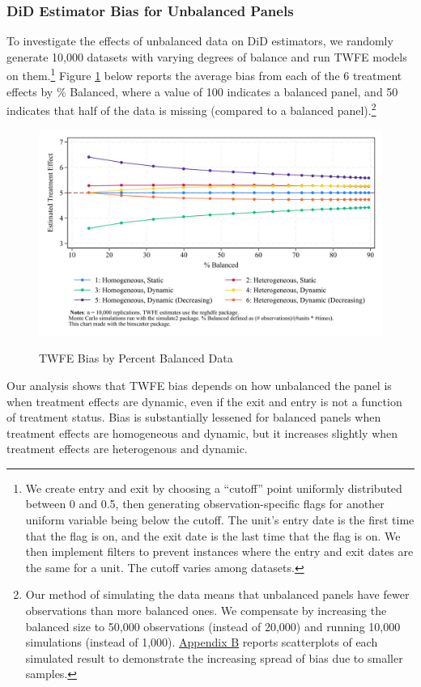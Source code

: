 \documentclass[12pt]{article}
\begin{document}
\subsubsection{DiD Estimator Bias for Unbalanced Panels}
To investigate the effects of unbalanced data on DiD estimators, we randomly generate 10,000 datasets with varying degrees of balance and run TWFE models on them.\footnote{\label{pcunbalancedfn}We create entry and exit by choosing a “cutoff” point uniformly distributed between 0 and 0.5, then generating observation-specific flags for another uniform variable being below the cutoff. The unit’s entry date is the first time that the flag is on, and the exit date is the last time that the flag is on. We then implement filters to prevent instances where the entry and exit dates are the same for a unit. The cutoff varies among datasets.}  Figure \ref{fig:pc-balance} below reports the average bias from each of the 6 treatment effects by \% Balanced, where a value of 100 indicates a balanced panel, and 50 indicates that half of the data is missing (compared to a balanced panel).\footnote{Our method of simulating the data means that unbalanced panels have fewer observations than more balanced ones. We compensate by increasing the balanced size to 50,000 observations (instead of 20,000) and running 10,000 simulations (instead of 1,000). \hyperref[sec:appendixb]{Appendix B} reports scatterplots of each simulated result to demonstrate the increasing spread of bias due to smaller samples.}
\begin{figure}[H]
    \centering
    \caption{TWFE Bias by Percent Balanced Data}
    \includegraphics[width=6in]{Figures/TWFE Bias by Percent Balanced Crop.jpg}
    \label{fig:pc-balance}
\end{figure}
\noindent
Our analysis shows that TWFE bias depends on how unbalanced the panel is when treatment effects are dynamic, even if the exit and entry is not a function of treatment status. Bias is substantially lessened for balanced panels when treatment effects are homogeneous and dynamic, but it increases slightly when treatment effects are heterogenous and dynamic.
\end{document}
